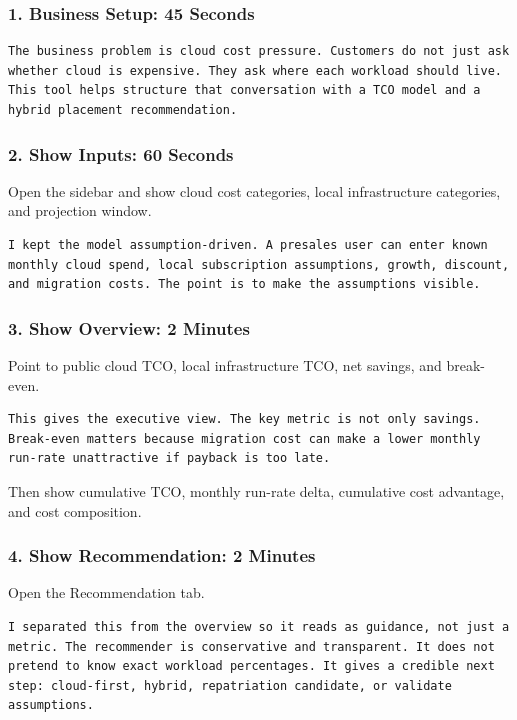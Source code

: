 \documentclass[11pt,a4paper]{article}
\begin{document}
\subsubsection{1. Business Setup: 45 Seconds}

\begin{lstlisting}
The business problem is cloud cost pressure. Customers do not just ask whether cloud is expensive. They ask where each workload should live. This tool helps structure that conversation with a TCO model and a hybrid placement recommendation.
\end{lstlisting}

\subsubsection{2. Show Inputs: 60 Seconds}

Open the sidebar and show cloud cost categories, local infrastructure categories, and projection window.

\begin{lstlisting}
I kept the model assumption-driven. A presales user can enter known monthly cloud spend, local subscription assumptions, growth, discount, and migration costs. The point is to make the assumptions visible.
\end{lstlisting}

\subsubsection{3. Show Overview: 2 Minutes}

Point to public cloud TCO, local infrastructure TCO, net savings, and break-even.

\begin{lstlisting}
This gives the executive view. The key metric is not only savings. Break-even matters because migration cost can make a lower monthly run-rate unattractive if payback is too late.
\end{lstlisting}

Then show cumulative TCO, monthly run-rate delta, cumulative cost advantage, and cost composition.

\subsubsection{4. Show Recommendation: 2 Minutes}

Open the Recommendation tab.

\begin{lstlisting}
I separated this from the overview so it reads as guidance, not just a metric. The recommender is conservative and transparent. It does not pretend to know exact workload percentages. It gives a credible next step: cloud-first, hybrid, repatriation candidate, or validate assumptions.
\end{lstlisting}
\end{document}
